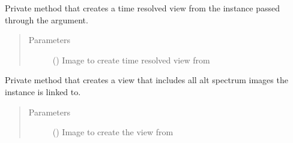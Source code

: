 \documentclass[letterpaper,10pt,english]{sphinxmanual}
\begin{document}
\begin{fulllineitems}
\begin{fulllineitems}
\begin{quote}
\begin{description}
\begin{itemize}
\end{itemize}

\end{description}\end{quote}

\end{fulllineitems}


\begin{fulllineitems}
\label{\detokenize{polo.widgets:polo.widgets.slideshow_viewer.SlideshowViewer._set_all_dates_scene}}
Private method that creates a time resolved view from the {\hyperref[\detokenize{polo.crystallography:polo.crystallography.image.Image}]{}} 
instance passed through the  argument.
\begin{quote}\begin{description}
\item[{Parameters}] \leavevmode
{} ({\hyperref[\detokenize{polo.crystallography:polo.crystallography.image.Image}]{}}) \textendash{} Image to create time resolved view from

\end{description}\end{quote}

\end{fulllineitems}


\begin{fulllineitems}
\label{\detokenize{polo.widgets:polo.widgets.slideshow_viewer.SlideshowViewer._set_all_spectrums_scene}}
Private method that creates a view that includes all alt spectrum
images the {\hyperref[\detokenize{polo.crystallography:polo.crystallography.image.Image}]{}} instance is linked to.
\begin{quote}\begin{description}
\item[{Parameters}] \leavevmode
{} ({\hyperref[\detokenize{polo.crystallography:polo.crystallography.image.Image}]{}}) \textendash{} Image to create the view from


\end{description}
\end{quote}
\end{fulllineitems}
\end{fulllineitems}
\end{document}
